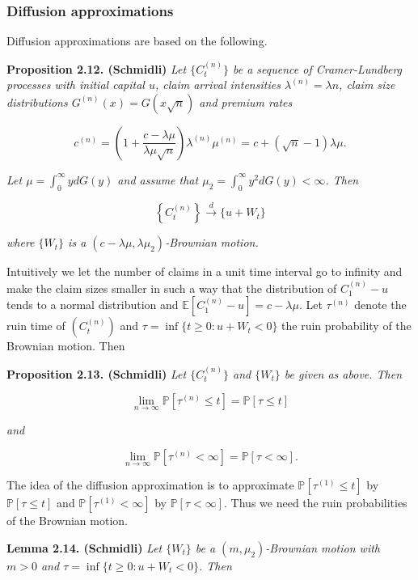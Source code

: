 \documentclass[a4paper,12pt,openany]{book}
\begin{document}
\hypertarget{diffusion-approximations}{%
\subsubsection{Diffusion approximations}\label{diffusion-approximations}}

Diffusion approximations are based on the following.

\textbf{Proposition 2.12. (Schmidli)} \emph{Let \(\{C_t^{(n)}\}\) be a sequence of Cramer-Lundberg processes with initial capital \(u\), claim arrival intensities \(\lambda^{(n)}=\lambda n\), claim size distributions \(G^{(n)}(x)=G(x\sqrt n)\) and premium rates}

\[
c^{(n)}=\left(1 + \frac{c-\lambda \mu}{\lambda \mu\sqrt n}\right)\lambda^{(n)}\mu^{(n)}=c+(\sqrt n -1)\lambda\mu.
\]

\emph{Let \(\mu=\int_0^\infty y dG(y)\) and assume that \(\mu_2 = \int_0^\infty y^2dG(y)<\infty\). Then}

\[
\left\{C_t^{(n)}\right\}\stackrel{d}{\to} \{u+ W_t\}
\]

\emph{where \(\{W_t\}\) is a \((c-\lambda \mu,\lambda\mu_2)\)-Brownian motion.}

Intuitively we let the number of claims in a unit time interval go to infinity and make the claim sizes smaller in such a way that the distribution of \(C^{(n)}_1 − u\) tends to a normal distribution and \(\mathbb E [C^{(n)}_1 − u] = c − \lambda \mu\). Let \(\tau^{(n)}\) denote the ruin time of \((C^{(n)}_t)\) and \(\tau = \inf\{t \ge 0 : u+W_t < 0\}\) the ruin probability of the Brownian motion. Then

\textbf{Proposition 2.13. (Schmidli)} \emph{Let \(\{C_t^{(n)}\}\) and \(\{W_t\}\) be given as above. Then}

\[
\lim_{n\to\infty} \mathbb P[\tau^{(n)}\le t]=\mathbb P[\tau \le t]
\]

\emph{and}

\[
\lim_{n\to\infty} \mathbb P[\tau^{(n)}< \infty]=\mathbb P[\tau < \infty].
\]

The idea of the diffusion approximation is to approximate \(\mathbb P [\tau^{(1)}\le t]\) by \(\mathbb P [\tau\le t]\) and \(\mathbb P [\tau^{(1)} < \infty]\) by \(\mathbb P [\tau < \infty]\). Thus we need the ruin probabilities of the Brownian motion.

\textbf{Lemma 2.14. (Schmidli)} \emph{Let \(\{W_t\}\) be a \((m,\mu_2)\)-Brownian motion with \(m > 0\) and \(\tau = \inf\{t\ge 0 : u+W_t <0\}\). Then}
\end{document}
